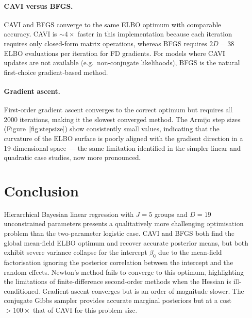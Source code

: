 \documentclass[11pt,a4paper]{article}
\begin{document}
\paragraph{CAVI versus BFGS.}
CAVI and BFGS converge to the same ELBO optimum with comparable accuracy.
CAVI is $\sim 4\times$ faster in this implementation because each iteration requires
only closed-form matrix operations, whereas BFGS requires $2D = 38$ ELBO evaluations
per iteration for FD gradients.
For models where CAVI updates are not available (e.g.\ non-conjugate likelihoods),
BFGS is the natural first-choice gradient-based method.

\paragraph{Gradient ascent.}
First-order gradient ascent converges to the correct optimum but requires all 2000
iterations, making it the slowest converged method.
The Armijo step sizes (Figure~\ref{fig:stepsize}) show consistently small values,
indicating that the curvature of the ELBO surface is poorly aligned with the gradient
direction in a 19-dimensional space --- the same limitation identified in the simpler
linear and quadratic case studies, now more pronounced.

\section{Conclusion}

Hierarchical Bayesian linear regression with $J=5$ groups and $D=19$ unconstrained
parameters presents a qualitatively more challenging optimisation problem than the
two-parameter logistic case.
CAVI and BFGS both find the global mean-field ELBO optimum and recover accurate
posterior means, but both exhibit severe variance collapse for the intercept $\beta_0$
due to the mean-field factorisation ignoring the posterior correlation between the
intercept and the random effects.
Newton's method fails to converge to this optimum, highlighting the limitations of
finite-difference second-order methods when the Hessian is ill-conditioned.
Gradient ascent converges but is an order of magnitude slower.
The conjugate Gibbs sampler provides accurate marginal posteriors but at a cost
$>100\times$ that of CAVI for this problem size.

\printbibliography
\end{document}
